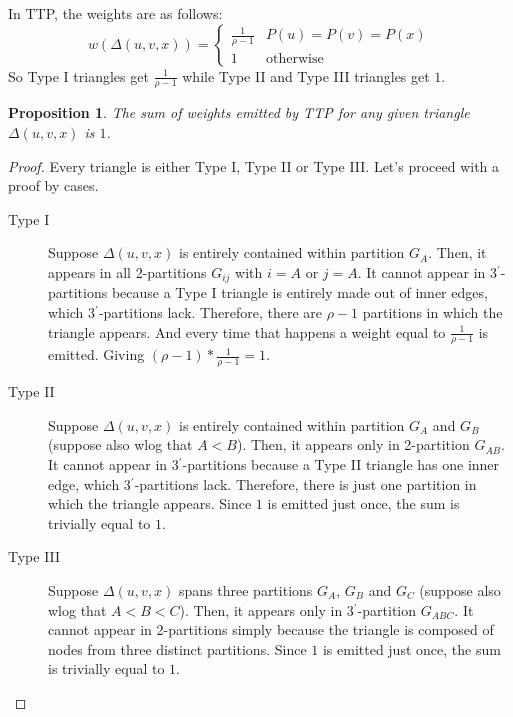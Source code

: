 \documentclass[paper=a4, fontsize=11pt]{scrartcl}
\newtheorem{proposition}{Proposition}
\begin{document}
In TTP, the weights are as follows:
\begin{equation} \label{ttpweights}
    w(\Delta(u,v,x)) = \begin{cases}
        \frac{1}{\rho-1} & P(u) = P(v) = P(x)  \\
        1 & \text{otherwise}
    \end{cases}
\end{equation}
So Type I triangles get $\frac{1}{\rho-1}$ while Type II and Type III triangles
get $1$.

\begin{proposition}
    The sum of weights emitted by TTP for any given triangle $\Delta(u, v, x)$ is $1$.
\end{proposition}
\begin{proof}
    Every triangle is either Type I, Type II or Type III. Let's proceed with a
    proof by cases.
    \begin{description}
        \item[Type I] Suppose $\Delta(u, v, x)$ is entirely contained within
        partition $G_A$. Then, it appears in all 2-partitions $G_{ij}$ with
        $i=A$ or $j=A$. It cannot appear in 3$^\prime$-partitions because a Type
        I triangle is entirely made out of inner edges, which
        3$^\prime$-partitions lack. Therefore, there are $\rho-1$ partitions in
        which the triangle appears. And every time that happens a weight equal
        to $\frac{1}{\rho-1}$ is emitted. Giving $(\rho-1)*\frac{1}{\rho-1}=1$.

        \item[Type II] Suppose $\Delta(u, v, x)$ is entirely contained within
        partition $G_A$ and $G_B$ (suppose also wlog that $A<B$). Then, it
        appears only in 2-partition $G_{AB}$. It cannot appear in
        3$^\prime$-partitions because a Type II triangle has one inner edge,
        which 3$^\prime$-partitions lack. Therefore, there is just one partition
        in which the triangle appears. Since $1$ is emitted just once, the sum
        is trivially equal to $1$.

        \item[Type III] Suppose $\Delta(u, v, x)$ spans three partitions $G_A$,
        $G_B$ and $G_C$ (suppose also wlog that $A<B<C$). Then, it appears only
        in 3$^\prime$-partition $G_{ABC}$. It cannot appear in 2-partitions
        simply because the triangle is composed of nodes from three distinct
        partitions. Since $1$ is emitted just once, the sum is trivially equal
        to $1$.
    \end{description}
\end{proof}
\end{document}
